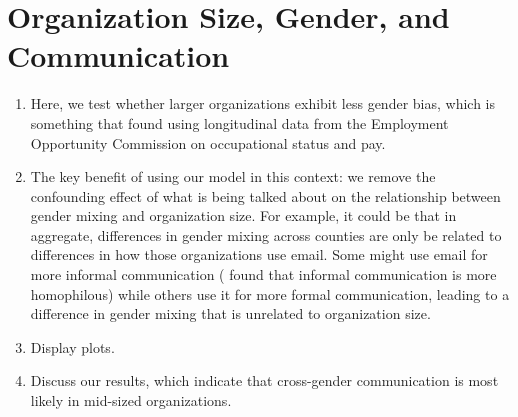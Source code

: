 \documentclass[fleqn]{MJDArticle}
\begin{document}
\section{Organization Size, Gender, and Communication}
\begin{enumerate}
	\item Here, we test whether larger organizations exhibit less gender bias, which is something that \cite{Huffman2010} found using longitudinal data from the Employment Opportunity Commission on occupational status and pay. 
	\item The key benefit of using our model in this context: we remove the confounding effect of what is being talked about on the relationship between gender mixing and organization size. For example, it could be that in aggregate, differences in gender mixing across counties are only be related to differences in how those organizations use email. Some might use email for more informal communication (\citep{Ibarra1992} found that informal communication is more homophilous) while others use it for more formal communication, leading to a difference in gender mixing that is unrelated to organization size.
	\item Display plots.
	\item Discuss our results, which indicate that cross-gender communication is most likely in mid-sized organizations. 
\end{enumerate}






\end{document}
